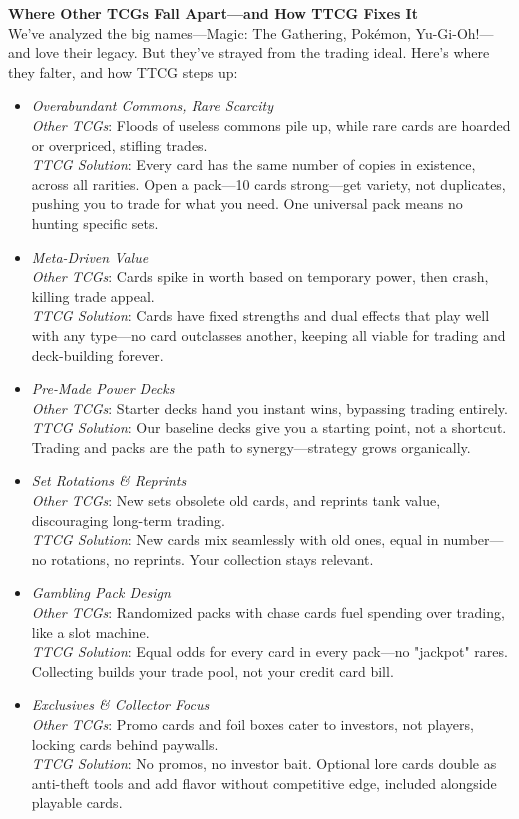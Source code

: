 \textbf{Where Other TCGs Fall Apart—and How TTCG Fixes It} \\
We’ve analyzed the big names—Magic: The Gathering, Pokémon, Yu-Gi-Oh!—and love their legacy. But they’ve strayed from the trading ideal. Here’s where they falter, and how TTCG steps up:
\begin{itemize}
    \item \textit{Overabundant Commons, Rare Scarcity} \\
        \textit{Other TCGs}: Floods of useless commons pile up, while rare cards are hoarded or overpriced, stifling trades. \\
        \textit{TTCG Solution}: Every card has the same number of copies in existence, across all rarities. Open a pack—10 cards strong—get variety, not duplicates, pushing you to trade for what you need. One universal pack means no hunting specific sets.
    \item \textit{Meta-Driven Value} \\
        \textit{Other TCGs}: Cards spike in worth based on temporary power, then crash, killing trade appeal. \\
        \textit{TTCG Solution}: Cards have fixed strengths and dual effects that play well with any type—no card outclasses another, keeping all viable for trading and deck-building forever.
    \item \textit{Pre-Made Power Decks} \\
        \textit{Other TCGs}: Starter decks hand you instant wins, bypassing trading entirely. \\
        \textit{TTCG Solution}: Our baseline decks give you a starting point, not a shortcut. Trading and packs are the path to synergy—strategy grows organically.
    \item \textit{Set Rotations \& Reprints} \\
        \textit{Other TCGs}: New sets obsolete old cards, and reprints tank value, discouraging long-term trading. \\
        \textit{TTCG Solution}: New cards mix seamlessly with old ones, equal in number—no rotations, no reprints. Your collection stays relevant.
    \item \textit{Gambling Pack Design} \\
        \textit{Other TCGs}: Randomized packs with chase cards fuel spending over trading, like a slot machine. \\
        \textit{TTCG Solution}: Equal odds for every card in every pack—no "jackpot" rares. Collecting builds your trade pool, not your credit card bill.
    \item \textit{Exclusives \& Collector Focus} \\
        \textit{Other TCGs}: Promo cards and foil boxes cater to investors, not players, locking cards behind paywalls. \\
        \textit{TTCG Solution}: No promos, no investor bait. Optional lore cards double as anti-theft tools and add flavor without competitive edge, included alongside playable cards.
\end{itemize}

